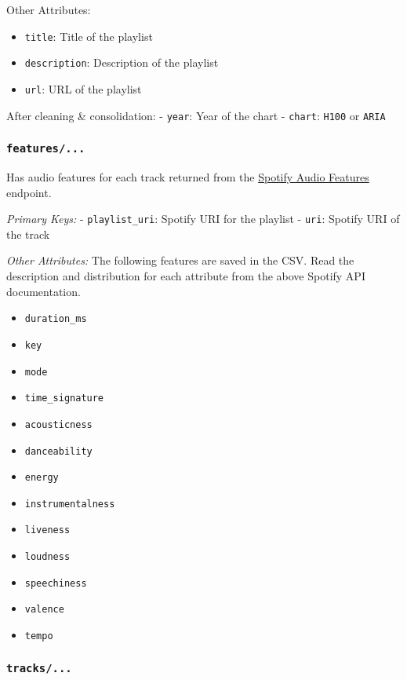 \documentclass[
]{article}
\providecommand{\tightlist}{%
  \setlength{\itemsep}{0pt}\setlength{\parskip}{0pt}}
\begin{document}
Other Attributes:

\begin{itemize}
\tightlist
\item
  \texttt{title}: Title of the playlist
\item
  \texttt{description}: Description of the playlist
\item
  \texttt{url}: URL of the playlist
\end{itemize}

After cleaning \& consolidation: - \texttt{year}: Year of the chart -
\texttt{chart}: \texttt{H100} or \texttt{ARIA}

\hypertarget{features...}{%
\subsubsection{\texorpdfstring{\texttt{features/...}}{features/...}}\label{features...}}

Has audio features for each track returned from the
\href{https://developer.spotify.com/documentation/web-api/reference/tracks/get-audio-features/}{Spotify
Audio Features} endpoint.

\emph{Primary Keys:} - \texttt{playlist\_uri}: Spotify URI for the
playlist - \texttt{uri}: Spotify URI of the track

\emph{Other Attributes:} The following features are saved in the CSV.
Read the description and distribution for each attribute from the above
Spotify API documentation.

\begin{itemize}
\tightlist
\item
  \texttt{duration\_ms}
\item
  \texttt{key}
\item
  \texttt{mode}
\item
  \texttt{time\_signature}
\item
  \texttt{acousticness}
\item
  \texttt{danceability}
\item
  \texttt{energy}
\item
  \texttt{instrumentalness}
\item
  \texttt{liveness}
\item
  \texttt{loudness}
\item
  \texttt{speechiness}
\item
  \texttt{valence}
\item
  \texttt{tempo}
\end{itemize}

\hypertarget{tracks...}{%
\subsubsection{\texorpdfstring{\texttt{tracks/...}}{tracks/...}}\label{tracks...}}
\end{document}

